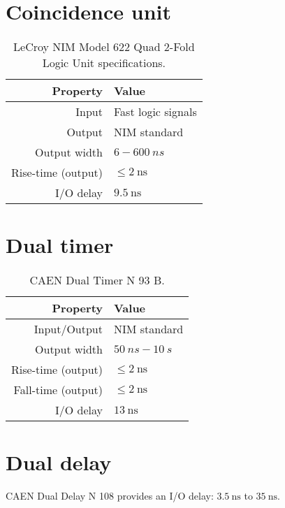 \section{Coincidence unit} \label{app:coincidence unit}

\begin{table}[!htp]
	\centering
	\begin{tabular}{rl}
		\toprule
		Property	  & Value 	 \\
		\midrule
		Input & Fast logic signals\\
		Output & NIM standard\\
		Output width & $6-\SI{600}{ns}$\\
		Rise-time (output)	&	$\leq \SI{2}{\nano\second}$\\
		I/O delay	&	$\SI{9.5}{\nano\second}$\\
		\bottomrule		
	\end{tabular}
	\caption{LeCroy NIM Model 622 Quad 2-Fold Logic Unit specifications.}
\end{table}


\section{Dual timer} \label{app:Dual Timer}
\begin{table}[!htp]
	\centering
	\begin{tabular}{rl}
		\toprule
		Property	  & Value 	 \\
		\midrule
		Input/Output & NIM standard\\
		Output width & $\SI{50}{ns}-\SI{10}{s}$\\
		Rise-time (output)	&	$\leq \SI{2}{\nano\second}$\\
		Fall-time (output)	&	$\leq \SI{2}{\nano\second}$\\
		I/O delay	&	$\SI{13}{\nano\second}$\\
		\bottomrule		
	\end{tabular}
	\caption{CAEN Dual Timer N 93 B.}
\end{table}



\section{Dual delay} \label{app:Dual Delay}
CAEN Dual Delay N 108 provides an I/O delay: $\SI{3.5}{\nano\second}$ to $\SI{35}{\nano\second}$.


